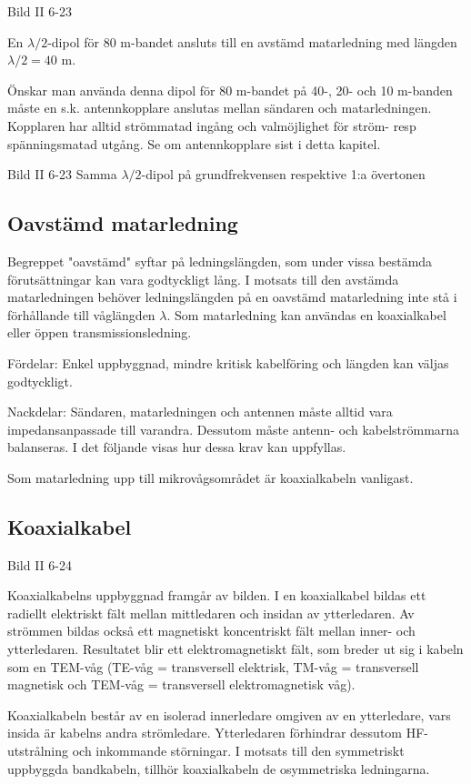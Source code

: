 Bild II 6-23

En \(\lambda/2\)-dipol för 80 m-bandet ansluts till en avstämd
matarledning med längden \(\lambda/2 = 40\) m.

Önskar man använda denna dipol för 80 m-bandet på 40-, 20- och 10
m-banden måste en s.k. antennkopplare anslutas mellan sändaren och
matarledningen. Kopplaren har alltid strömmatad ingång och
valmöjlighet för ström- resp spänningsmatad utgång. Se om
antennkopplare sist i detta kapitel.

Bild II 6-23 Samma \(\lambda/2\)-dipol på grundfrekvensen respektive 1:a övertonen


\subsection{Oavstämd matarledning}

Begreppet "oavstämd" syftar på ledningslängden, som under vissa
bestämda förutsättningar kan vara godtyckligt lång. I motsats till den
avstämda matarledningen behöver ledningslängden på en oavstämd
matarledning inte stå i förhållande till våglängden \(\lambda\). Som
matarledning kan användas en koaxialkabel eller öppen
transmissionsledning.

Fördelar: Enkel uppbyggnad, mindre kritisk kabelföring och längden kan
väljas godtyckligt.

Nackdelar: Sändaren, matarledningen och antennen måste alltid vara
impedansanpassade till varandra. Dessutom måste antenn- och
kabelströmmarna balanseras. I det följande visas hur dessa krav kan
uppfyllas.

Som matarledning upp till mikrovågsområdet är koaxialkabeln vanligast.

\subsection{Koaxialkabel}

Bild II 6-24

Koaxialkabelns uppbyggnad framgår av bilden. I en koaxialkabel bildas
ett radiellt elektriskt fält mellan mittledaren och insidan av
ytterledaren. Av strömmen bildas också ett magnetiskt koncentriskt
fält mellan inner- och ytterledaren. Resultatet blir ett
elektromagnetiskt fält, som breder ut sig i kabeln som en TEM-våg
(TE-våg = transversell elektrisk, TM-våg = transversell magnetisk och
TEM-våg = transversell elektromagnetisk våg).

Koaxialkabeln består av en isolerad innerledare omgiven av en
ytterledare, vars insida är kabelns andra strömledare. Ytterledaren
förhindrar dessutom HF-utstrålning och inkommande störningar. I
motsats till den symmetriskt uppbyggda bandkabeln, tillhör
koaxialkabeln de osymmetriska ledningarna.

